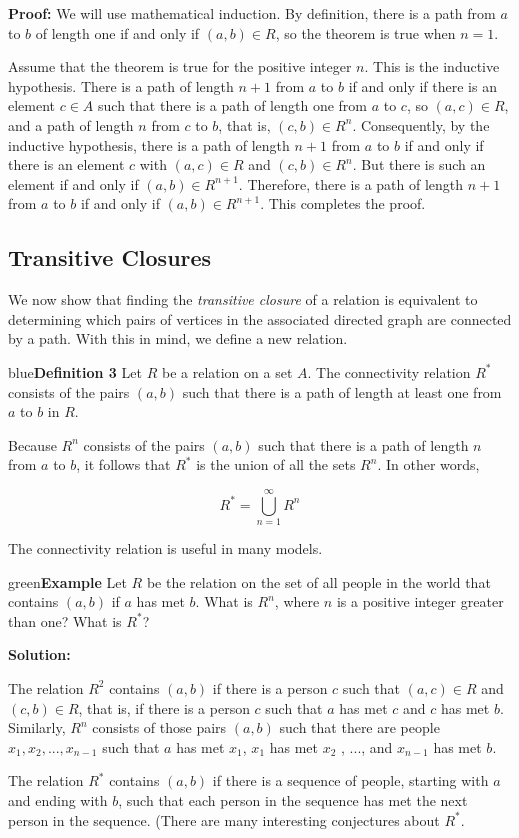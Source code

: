 \documentclass[11pt]{article}
\newenvironment{example}[1][\unskip]{\begin{mybox}{green}{\textbf{Example} {#1}}}{\end{mybox}}
\newenvironment{definition}[1]{\begin{mybox}{blue}{\textbf{Definition #1}}}{\end{mybox}}
\begin{document}
\textbf{Proof:} We will use mathematical induction. By definition, there is a path from $a$ to $b$ of length one if and only if $(a, b) \in R$, so the theorem is true when $n = 1$.

Assume that the theorem is true for the positive integer $n$. This is the inductive hypothesis. There is a path of length $n + 1$ from $a$ to $b$ if and only if there is an element $c \in A$ such that there is a path of length one from $a$ to $c$, so $(a, c) \in R$, and a path of length $n$ from $c$ to $b$, that is, $(c, b) \in R^n$. Consequently, by the inductive hypothesis, there is a path of length $n + 1$ from $a$ to $b$ if and only if there is an element $c$ with $(a, c) \in R$ and $(c, b) \in R^n$. But there is such an element if and only if $(a, b) \in R^{n+1}$. Therefore, there is a path of length $n + 1$ from $a$ to $b$ if and only if $(a, b) \in R^{n+1}$. This completes the proof.


\subsection{Transitive Closures}

We now show that finding the \textit{transitive closure} of a relation is equivalent to determining which pairs of vertices in the associated directed graph are connected by a path. With this in mind, we define a new relation.

\begin{definition}{3}
Let $R$ be a relation on a set $A$. The connectivity relation $R^*$ consists of the pairs $(a, b)$ such that there is a path of length at least one from $a$ to $b$ in $R$.
\end{definition}

Because $R^n$ consists of the pairs $(a, b)$ such that there is a path of length $n$ from $a$ to $b$, it follows that $R^*$ is the union of all the sets $R^n$. In other words,

\begin{equation*}
    R^* = \bigcup^{\infty}_{n=1} R^n
\end{equation*}

The connectivity relation is useful in many models.

\begin{example}
Let $R$ be the relation on the set of all people in the world that contains $(a, b)$ if $a$ has met $b$. What is $R^n$, where $n$ is a positive integer greater than one? What is $R^*$?

\textbf{Solution:}

The relation $R^2$ contains $(a, b)$ if there is a person $c$ such that $(a, c) \in R$ and $(c, b) \in R$, that is, if there is a person $c$ such that $a$ has met $c$ and $c$ has met $b$. Similarly, $R^n$ consists of those pairs $(a, b)$ such that there are people $x_1, x_2, ..., x_{n-1}$ such that $a$ has met $x_1$, $x_1$ has met $x_2$ , ..., and $x_{n-1}$ has met $b$. 

The relation $R^*$ contains $(a, b)$ if there is a sequence of people, starting with $a$ and ending with $b$, such that each person in the sequence has met the next person in the sequence. (There are many interesting conjectures about $R^*$.
\end{example}
\end{document}
